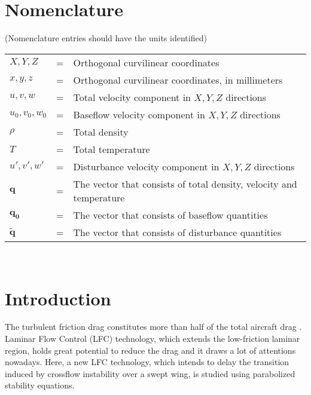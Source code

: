\documentclass{AIAA}
\begin{document}
\maketitle

\section*{Nomenclature}
(Nomenclature entries should have the units identified)\\
\noindent\begin{tabular}{@{}lcl@{}}
$X,Y,Z$                 &=& Orthogonal curvilinear coordinates \\
$x,y,z$               &=& Orthogonal curvilinear coordinates, in millimeters \\
$u,v,w$               &=& Total velocity component in $X,Y,Z$ directions \\
$u_0,v_0,w_0$         &=& Baseflow velocity component in $X,Y,Z$ directions \\
$\rho$                &=& Total density \\
$T$                   &=& Total temperature \\
$u',v',w'$            &=& Disturbance velocity component in $X,Y,Z$ directions \\
$\mathbf{q}$          &=& The vector that consists of total density, velocity and temperature \\
$\mathbf{q_0}$        &=& The vector that consists of baseflow quantities \\
$\mathbf{\tilde{q}}$  &=& The vector that consists of disturbance quantities \\
\end{tabular} \\



\section{Introduction}
The turbulent friction drag constitutes more than half of the total aircraft drag \cite{Schrauf2005}. Laminar Flow Control (LFC) technology, which extends the low-friction laminar region, holds great potential to reduce the drag and it draws a lot of attentions nowadays. Here, a new LFC technology, which intends to delay the transition induced by crossflow instability over a swept wing, is studied using parabolized stability equations.
\end{document}
